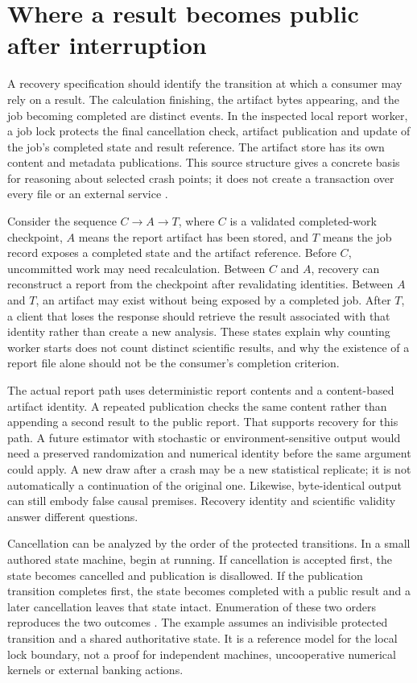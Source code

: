 \section{Where a result becomes public after interruption}
\label{exec17:i4-publication}

A recovery specification should identify the transition at which a consumer
may rely on a result. The calculation finishing, the artifact bytes appearing,
and the job becoming completed are distinct events. In the inspected local
report worker, a job lock protects the final cancellation check, artifact
publication and update of the job's completed state and result reference.
The artifact store has its own content and metadata publications. This
source structure gives a concrete basis for reasoning about selected crash
points; it does not create a transaction over every file or an external
service \citep{exec13_ops_source}.

Consider the sequence $C\to A\to T$, where $C$ is a validated completed-work
checkpoint, $A$ means the report artifact has been stored, and $T$ means the
job record exposes a completed state and the artifact reference. Before $C$,
uncommitted work may need recalculation. Between $C$ and $A$, recovery can
reconstruct a report from the checkpoint after revalidating identities.
Between $A$ and $T$, an artifact may exist without being exposed by a
completed job. After $T$, a client that loses the response should retrieve
the result associated with that identity rather than create a new analysis.
These states explain why counting worker starts does not count distinct
scientific results, and why the existence of a report file alone should not
be the consumer's completion criterion.

The actual report path uses deterministic report contents and a content-based
artifact identity. A repeated publication checks the same content rather
than appending a second result to the public report. That supports recovery
for this path. A future estimator with stochastic or environment-sensitive
output would need a preserved randomization and numerical identity before
the same argument could apply. A new draw after a crash may be a new
statistical replicate; it is not automatically a continuation of the original
one. Likewise, byte-identical output can still embody false causal premises.
Recovery identity and scientific validity answer different questions.

Cancellation can be analyzed by the order of the protected transitions. In a
small authored state machine, begin at running. If cancellation is accepted
first, the state becomes cancelled and publication is disallowed. If the
publication transition completes first, the state becomes completed with a
public result and a later cancellation leaves that state intact. Enumeration
of these two orders reproduces the two outcomes
\citep{exec17_integration_review_reference}. The example assumes an indivisible
protected transition and a shared authoritative state. It is a reference
model for the local lock boundary, not a proof for independent machines,
uncooperative numerical kernels or external banking actions.

